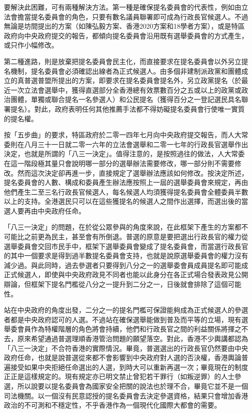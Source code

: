 要解決此困難，可有兩種解決方法。第一種是確保提名委員會的代表性，例如由立法會擔當提名委員會的角色，只要有數名議員聯署即可成為行政長官候選人。不過無論是坊間提出的方案（如陳弘毅方案、香港2020方案和18學者方案），或是特區政府向中央政府提交的報告，都傾向提名委員會沿用既有選舉委員會的方式產生，或只作小幅修改。

第二種進路，則是放棄把提名委員會民主化，而直接要求在提名委員會以外另立提名機制，提名委員會必須確認出線者為正式候選人。由多個非建制派政黨和團體成立的真普選普盟所提出的方案，即要求在提名委員會提名外，另立政黨提名（於最近一次立法會選舉中，獲得直選部分全香港總有效票數百分之五或以上的政黨或政治團體，單獨或聯合提名一名參選人）和公民提名（獲得百分之一登記選民具名聯署提名）。對此，政府表明任何其他推薦手法都不得妨礙提名委員會行使唯一實質的提名權。

按「五步曲」的要求，特區政府於二零一四年七月向中央政府提交報告，而人大常委則在八月三十一日就二零一六年的立法會選舉和二零一七年的行政長官選舉作出決定，也就是所謂的「八三一決定」。值得注意的，是按照過往的做法，人大常委在這一階段極其量只會說明哪一部分的選舉辦法需要修改，哪一部分則不需要修改。然而這次決定卻再進一步，直接規定了選舉辦法應該如何修改。按決定所述，提名委員會的人數、構成和委員產生辦法應按照上一屆的選舉委員會來規定，再由他們產生二至三名行政長官候選人，每名候選人均須獲得提名委員會全體委員半數以上的支持。全港選民只可以在這些獲提名的候選人之間作出選擇，而選出後的當選人要再由中央政府任命。

「八三一決定」的問題，在於從公眾參與的角度來說，在此框架下產生的方案都不可能比之前更為民主，甚至會有所倒退。普選的原意是要把選出行政長官的權力從選舉委員會交回市民手中，框架下選舉委員會變成了提名委員會，而當選行政長官的其中一個要求是得到過半數提名委員會支持，也就是說原選舉委員會的權力沒有減少過。與此同時，過去參選者只要得到八分之一的選舉委會員成員提名即可能成正式候選人，即使與中央政府政見不同者也能以此身分在各正式場合發表政見公開辯論，但框架下提名門檻從八分之一提升到二分之一，日後就會排除了這個可能性。

站在中央政府的角度出發，二分之一的提名門檻可保證能夠成為正式候選人的參選者都是中央政府認可的人選。不過站在確保選舉能做到普及而平等的立場，現有選舉委會員作為特權階層的角色將會持續，他們和行政長官之間的利益關係將揮之不去，原來希望通過普選理順香港管治問題的願望落空。對此，香港不少輿講都認為「八三一決定」不合符香港的實際情況。畢竟，普選選出的行政長官仍然要由中央政府任命，也就是說普選從來都不會影響到中央政府對人選的否決權，香港輿論普遍接受如果中央拒絕任命選出的人選，到時大可以重新再選一次；畢竟現在的制度正正是這樣規定的。現有規定亦已明文禁止曾犯若干罪行（如叛逆罪）的人士參選，所以說要以提名委員會為國家安全把關的說法也於理不合，畢竟它並不是一個司法機關。以一個沒有民意認授的提名委員會去決定參選資格，結果只會增加香港政治的不可測和不穩定性，不乎香港作為一個現代化國際大都會的需要。

